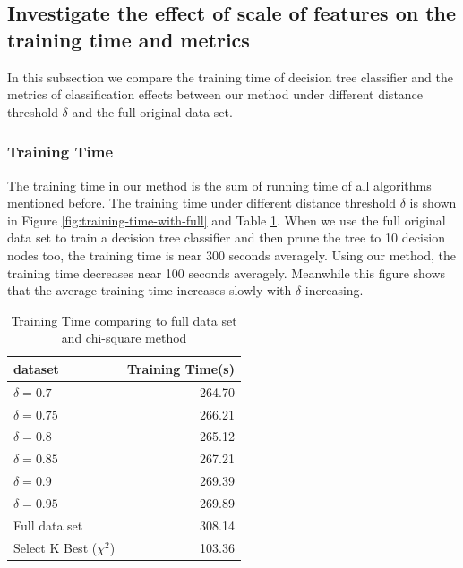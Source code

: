 \documentclass{ieeeaccess}
\theoremstyle{definition}
\begin{document}
\subsection{Investigate the effect of scale of features on the training time and metrics}

In this subsection we compare the training time of decision tree classifier and the metrics of classification effects between our method under different distance threshold $\delta$ and the full original data set.

\subsubsection{Training Time}

The training time in our method is the sum of running time of all algorithms mentioned before. The training time under different distance threshold $\delta$ is shown in Figure \ref{fig:training-time-with-full} and Table \ref{tab:training-time-all}.
When we use the full original data set to train a decision tree classifier and then prune the tree to 10 decision nodes too, the training time is near 300 seconds averagely. Using our method, the training time decreases near 100 seconds averagely.
Meanwhile this figure shows that the average training time increases slowly with $\delta$ increasing.

\begin{table}[!htbp]
    \centering
    \caption{Training Time comparing to full data set and chi-square method}
    \label{tab:training-time-all}
    \begin{tabular}{lr}
        \toprule
        dataset & Training Time(s) \\
        \midrule
        $\delta=0.7$ & 264.70 \\
        $\delta=0.75$ & 266.21 \\
        $\delta=0.8$ & 265.12 \\
        $\delta=0.85$ &  267.21 \\
        $\delta=0.9$ &   269.39 \\
        $\delta=0.95$ & 269.89 \\
        Full data set & 308.14 \\
        Select K Best ($\chi^2$) & 103.36 \\
        \bottomrule
    \end{tabular}
\end{table}
\end{document}
